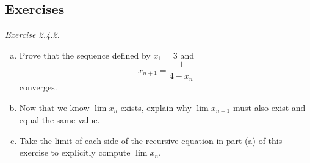 \subsection{Exercises}

	\emph{Exercise 2.4.2.}
		\begin{enumerate}[(a)]
			\item Prove that the sequence defined by $x_1 = 3$ and 
				\[		x_{n+1} = \frac{1}{4-x_n}\]
				converges.
			\item Now that we know $\lim x_n$ exists, explain why $\lim x_{n+1}$ must also exist and equal the same value.
			\item Take the limit of each side of the recursive equation in part (a) of this exercise to explicitly compute  $\lim x_n$.
		\end{enumerate}
		
